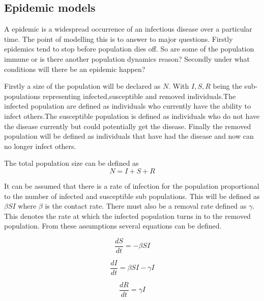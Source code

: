 \documentclass[final]{cmpreport}
\begin{document}
	\subsection{Epidemic models}
	A epidemic is a widespread occurrence of an infectious disease over a particular time. The point of modelling this is to answer to major questions. Firstly epidemics tend to stop before population dies off. So are some of the population immune or is there another population dynamics reason? Secondly under what conditions will there be an epidemic happen?
	
	Firstly a size of the population will be declared as $N$. With $I,S,R$ being the sub-populations representing infected,susceptible and removed individuals.The infected population are defined as individuals who currently have the ability to infect others.The susceptible population is defined as individuals who do not have the disease currently but could potentially get the disease. Finally the removed population will be defined as individuals that have had the disease and now can no longer infect others.
	
	The total population size can be defined as 
	\begin{equation}N = I+S+R \end{equation} 
	
	It can be assumed that there is a rate of infection for the population proportional to the number of infected and susceptible sub populations. This will be defined as  $\beta SI$ where $\beta$ is the contact rate. There must also be a removal rate defined as $\gamma$. This denotes the rate at which the infected population turns in to the removed population. From these assumptions several equations can be defined.
	
	
	\begin{equation} \frac{dS}{dt} = - \beta SI  \end{equation} 
	
	\begin{equation} \frac{dI}{dt} = \beta SI - \gamma I \end{equation}
	
	\begin{equation} \frac{dR}{dt} = \gamma I\end{equation}
	
\end{document}
